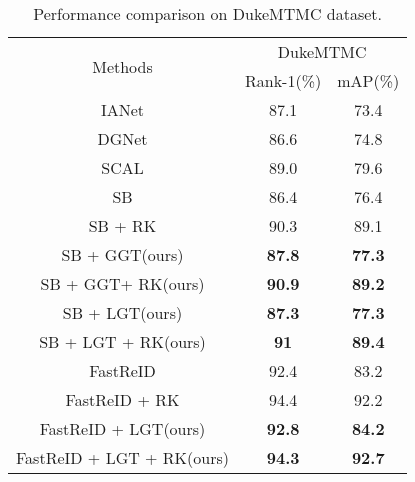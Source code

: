 \documentclass[10pt,twocolumn,letterpaper]{article}
\begin{document}
\begin{table}[]
\centering 
	\setlength\tabcolsep{3pt}\caption{Performance comparison on DukeMTMC dataset.}
	\begin{tabular}{ccc}
		\hline
		\multirow{2}{*}{Methods}         & \multicolumn{2}{c}{DukeMTMC}              \\ \cline{2-3} 
		& Rank-1(\%)          & mAP(\%)             \\ \hline
		IANet\cite{IANet}           & 87.1                & 73.4                \\ 
		DGNet\cite{zheng2019joint}            & 86.6                & 74.8                \\ 
		SCAL\cite{SCAL}         & 89.0                & 79.6                \\ \hline
		SB\cite{stong_baseline} & 86.4                & 76.4                \\ 
		SB + RK\cite{re_ranking}                 & 90.3                & 89.1                \\ 
		SB + GGT(ours)             & \textbf{87.8} & \textbf{77.3} \\ 
		SB + GGT+ RK(ours)     & \textbf{90.9} & \textbf{89.2} \\ 
		SB + LGT(ours)             & \textbf{87.3} & \textbf{77.3} \\ 
		SB + LGT + RK(ours)    & \textbf{91}   & \textbf{89.4} \\ \hline
		FastReID\cite{FastReID}      & {92.4}       & {83.2}       \\ 
		FastReID + RK                & 94.4                & 92.2                \\ 
		FastReID + LGT(ours)             & \textbf{92.8} & \textbf{84.2}   \\ 
		FastReID + LGT + RK(ours)    & \textbf{94.3}       & \textbf{92.7} \\ \hline
	\end{tabular}
\end{table}
\end{document}
